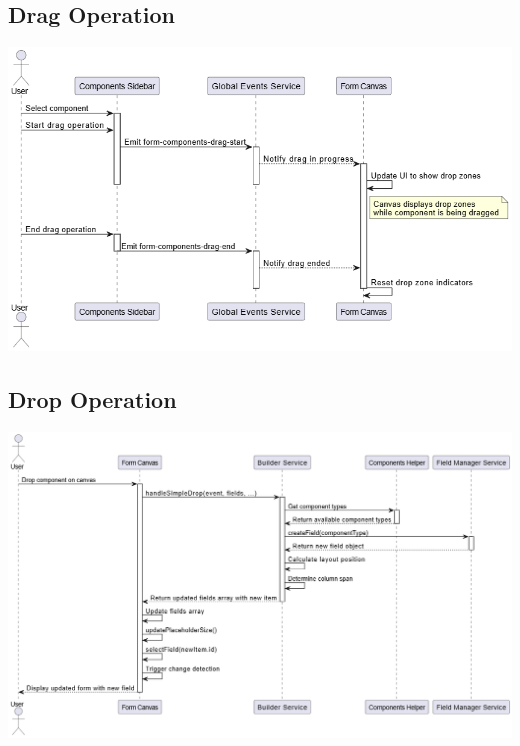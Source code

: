 \documentclass[a4paper,11pt]{article}
\begin{document}
\newpage
\subsection{ Drag Operation}
\includegraphics[width=1.1\textwidth]{drag.drawio}
\newpage



\subsection{ Drop Operation}
\includegraphics[width=1.1\textwidth]{drop.drawio}
\newpage
\end{document}

